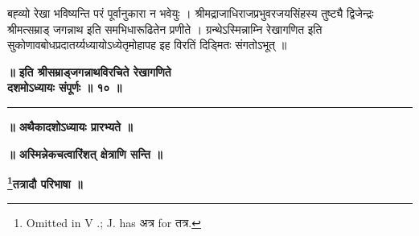 \documentclass[11pt, openany]{book}
\begin{document}
\noindent बह्व्यो रेखा भविष्यन्ति परं पूर्वानुकारा न भवेयुः । श्रीमद्राजाधिराजप्रभुवरजयसिंहस्य तुष्ट्यै द्विजेन्द्रः श्रीमत्सम्राड् जगन्नाथ इति समभिधारूढितेन प्रणीते । ग्रन्थेऽस्मिन्नाम्नि रेखागणित इति सुकोणावबोधप्रदातर्य्यध्यायोऽध्येतृमोहापह इह विरतिं दिड्मितः संगतोऽभूत् ॥\\

\begin{center}
\textbf{ ॥ इति श्रीसम्राड्जगन्नाथविरचिते रेखागणिते\\
 दशमोऽध्यायः संपूर्णः ॥ १० ॥}
 \vspace{3mm}
 
 \rule{0.5in}{0.3pt}
\end{center}
   

\newpage
{}
\afterpage{\fancyhead[LE,RO]{\thepage}}
\cfoot{}
\newpage
\newpage
\thispagestyle{empty}
\begin{center}
\textbf{\LARGE ॥ अथैकादशोऽध्यायः प्रारभ्यते ॥}
\end{center}
\vspace{3mm}

\begin{center}
\textbf{॥ अस्मिन्नेकचत्वारिंशत् क्षेत्राणि सन्ति ॥}
\vspace{5mm}

\textbf{\large \renewcommand{\thefootnote}{१}\footnote{ {\en Omitted in V .; J. has} अत्र {\en for} तत्र. }तत्रादौ परिभाषा ॥}
\end{center}
\vspace{2mm}
\end{document}
